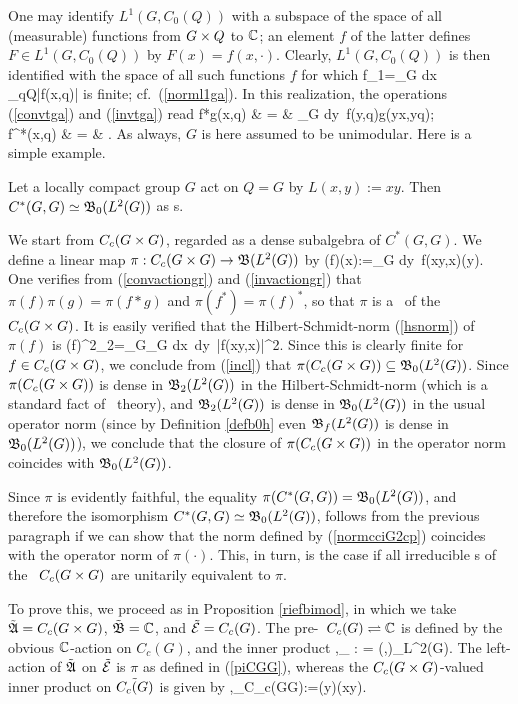 One may identify $L^1(G,C_0(Q))$ with a subspace of the space of all
(measurable) functions from $G\times Q$ to ${\Bbb C}$; an element $f$ of the latter
defines $F\in L^1(G,C_0(Q))$ by $F(x)=f(x,\cdot)$. Clearly,
$L^1(G,C_0(Q))$ is then identified with the space of all such functions
$f$ for which
\be
\n f\n_1=\int_G dx\, \sup_{q\in Q}|f(x,q)| 
\ee
is finite; cf.\ (\ref{norml1ga}). In this realization, the operations
(\ref{convtga}) and (\ref{invtga}) read
\bea
f*g(x,q) & = & \int_G dy\, f(y,q)g(y\inv x,y\inv  q);  \\
f^*(x,q) & = & . 
\eea
As always, $G$ is here assumed to be unimodular.
Here is a simple example.
\begin{Proposition}
Let a locally compact group $G$ act on $Q=G$ by  $L(x,y):=xy$.
Then $C^*(G,G)\simeq {\frak B}_0(L^2(G))$ as \ca s.
\end{Proposition}

We start from $C_c(G\times G)$, regarded as a dense subalgebra of $C^*(G,G)$.
We define a linear map $\pi:C_c(G\times G)\rightarrow {\frak B}(L^2(G))$ by
\be
\pi(f)\Ps(x):=\int_G dy\, f(xy\inv,x)\Ps(y). 
\ee
One verifies from (\ref{convactiongr}) and (\ref{invactiongr}) that
$\pi(f)\pi(g)=\pi(f*g)$ and $\pi(f^*)=\pi(f)^*$, so that $\pi$ is
a \rep\ of the \sta\ $C_c(G\times G)$. It is easily verified that
the Hilbert-Schmidt-norm (\ref{hsnorm}) of $\pi(f)$ is
\be
\n\pi(f)\n^2_2=\int_G\int_G dx\, dy\, |f(xy\inv,x)|^2.
\ee
Since this is clearly finite for $f\in C_c(G\times G)$, we conclude from
(\ref{incl}) that $\pi(C_c(G\times G))\subseteq {\frak B}_0(L^2(G))$.
Since $\pi(C_c(G\times G))$ is dense in ${\frak B}_2(L^2(G))$ in the 
 Hilbert-Schmidt-norm (which is a standard fact of \Hs\ theory), and
${\frak B}_2(L^2(G))$ is dense in ${\frak B}_0(L^2(G))$ in the usual operator norm
(since by Definition \ref{defb0h} even ${\frak B}_f(L^2(G))$ is dense in 
 ${\frak B}_0(L^2(G))$), we conclude that the closure of 
 $\pi(C_c(G\times G))$ in the operator norm coincides with ${\frak B}_0(L^2(G))$.

Since $\pi$ is evidently faithful, the equality
$\pi(C^*(G,G))={\frak B}_0(L^2(G))$, and therefore the isomorphism
$C^*(G,G)\simeq {\frak B}_0(L^2(G))$, follows from the previous paragraph if
we can show that the norm defined by (\ref{normcciG2cp}) coincides
with the operator norm of $\pi(\cdot)$. This, in turn, is the case
if all irreducible \rep s of the \sta\ $C_c(G\times G)$ are unitarily
equivalent to $\pi$.

To prove this, we proceed as in Proposition \ref{riefbimod}, in
which we take $\tilde{{\frak A}}=C_c(G\times G)$, $\tilde{{\frak B}}={\Bbb C}$, and
$\tilde{{\cal E}}=C_c(G)$. The pre-\HCM\ $C_c(G)\rightleftharpoons{\Bbb C}$ is defined
by the obvious ${\Bbb C}$-action on $C_c(G)$, and the inner product
\be
\la \Ps,\Ph\ra_{\C} : =  (\Ps,\Ph)_{L^2(G)}.
\ee
The left-action of $\tilde{{\frak A}}$ on $\tilde{{\cal E}}$ is $\pi$ as defined in
(\ref{piCGG}), whereas the $C_c(G\times G)$-valued inner product on
$\tilde{C_c(G)}$ is given by
\be
 \la \Ps,\Ph\ra_{C_c(G\x G)}:=\Ps(y)\ovl{\Ph}(x\inv y).
\ee
 
